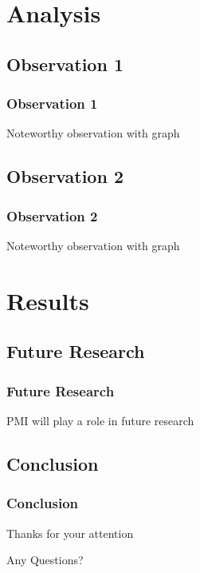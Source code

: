 \documentclass[10pt]{beamer}
\begin{document}
\section{Analysis}
\begin{frame}
\subsection{Observation 1}
\frametitle{Observation 1}

Noteworthy observation with graph

\end{frame}
\begin{frame}
\subsection{Observation 2}
\frametitle{Observation 2}

Noteworthy observation with graph

\end{frame}
\section{Results}
\begin{frame}
\subsection{Future Research}
\frametitle{Future Research}

PMI will play a role in future research

\end{frame}
\begin{frame}
\subsection{Conclusion}
\frametitle{Conclusion}

Thanks for your attention

\vspace{1cm}

Any Questions?

\end{frame}
\end{document}

